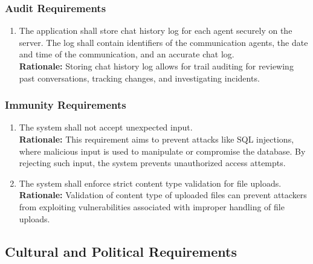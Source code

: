 \documentclass[]{article}
\begin{document}
\subsubsection{Audit Requirements}
\label{ssub:audit_requirements}
\begin{enumerate}[{SR-AU}1. ]
    \item The application shall store chat history log for each agent securely on the server. The log shall contain 
    identifiers of the communication agents, the date and time of the communication, and an accurate chat log. \\
    {\bf Rationale:} Storing chat history log allows for trail auditing for reviewing past conversations, tracking changes, 
    and investigating incidents.
\end{enumerate}
\subsubsection{Immunity Requirements}
\label{ssub:immunity_requirements}
\begin{enumerate}[{SR-IM}1. ]
    \item The system shall not accept unexpected input. \\
    {\bf Rationale:} This requirement aims to prevent attacks like SQL injections, where malicious input is used to manipulate or compromise the database. By rejecting such input, the system prevents unauthorized
    access attempts.
    \item  The system shall enforce strict content type validation for file uploads. \\
    {\bf Rationale:} Validation of content type of uploaded files can prevent attackers from exploiting vulnerabilities associated with improper handling of file uploads.
\end{enumerate}


\subsection{Cultural and Political Requirements}
\label{sub:cultural_and_political_requirements}
\end{document}
